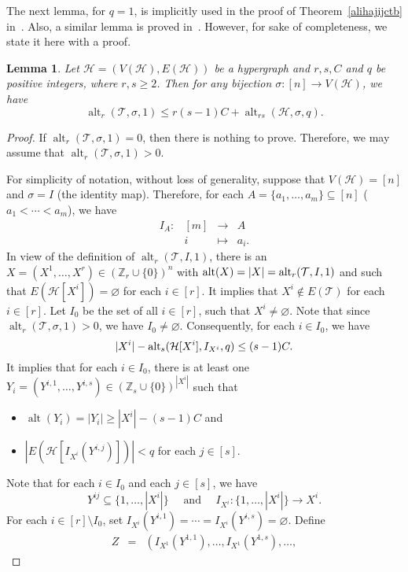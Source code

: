 \documentclass[11pt]{amsart}
\newtheorem{lemma}{Lemma}
\theoremstyle{definition}
\theoremstyle{remark}
\def\T{\mathsf{T}}
\def\alt{\operatorname{alt}}
\def\T{\mathcal{T}}
\begin{document}
The next lemma, for $q=1$, is implicitly used in the proof of Theorem~\ref{alihajijctb} in~\cite{2013arXiv1302.5394A}.  Also, a similar lemma is proved in~\cite{HaMe16}.
However, for sake of completeness, we state it here with a proof.
\begin{lemma}\label{altT}
Let $\mathcal{H}=(V(\mathcal{H}),E(\mathcal{H}))$ be a hypergraph and $r, s, C$ and $q$ be positive integers, where $r,s\geq 2$. 
Then for any bijection $\sigma: [n]\longrightarrow  V(\mathcal{H})$, we have
$$\alt_r(\T,\sigma,1)\leq r(s-1)C+\alt_{rs}(\mathcal{H},\sigma,q).$$
\end{lemma}
\begin{proof}
If $\alt_r(\T,\sigma,1)=0$, then there is nothing to prove. Therefore, we may assume that 
$\alt_r(\T,\sigma,1)>0$. 

For simplicity of notation, 
without loss of generality, suppose that $V(\mathcal{H})=[n]$ and $\sigma=I$ (the identity map).
Therefore, for each $A=\{a_1,\ldots,a_m\}\subseteq [n]$ ($a_1< \cdots< a_m$), we have
$$\begin{array}{lrll}
I_A:& [m] & \longrightarrow & A\\
	     & i    &\longmapsto    & a_i.
\end{array}
$$
In view of the definition of $\alt_r(\T,I,1)$, there is an $X=(X^1,\ldots,X^r)\in (\mathbb{Z}_r\cup\{0\})^n$ 
with ${\rm alt}(X)=|X|=\alt_r(\T,I,1)$ and 
such that $E(\mathcal{H}[X^i])=\varnothing$ for each $i\in[r]$. It implies that 
$X^i\not\in E(\T)$ for each $i\in[r]$. 
Let $I_0$ be the set of all $i\in[r]$, such that 
$X^i\neq\varnothing$. Note that since $\alt_r(\T,\sigma,1)>0$, we have $I_0\neq \varnothing$.
Consequently,  for each $i\in I_0$, 
we have 
$$|X^i|-{\rm alt}_s(\mathcal{H}[X^i],I_{X^i},q)\leq (s-1)C.$$
It implies that for each $i\in I_0$,  there is at least one  
$Y_i=(Y^{i,1},\ldots,Y^{i,s})\in(\mathbb{Z}_s\cup\{0\})^{|X^i|}$ such that 
\begin{itemize}
\item $\alt(Y_i)=|Y_i| \geq |X^i|-(s-1)C$ and
\item $|E(\mathcal{H}[I_{X^i}(Y^{i,j})])|<q$ for each $j\in[s]$.
\end{itemize}
Note that for each $i\in I_0$ and each $j\in[s]$, we have 
$$Y^{ij}\subseteq \{1,\ldots,|X^i|\}\quad\mbox{ and }\quad I_{X^i}:\{1,\ldots,|X^i|\}\longrightarrow X^i.$$ 
For each $i\in [r]\setminus I_0$, set $I_{X^i}(Y^{i,1})=\cdots=I_{X^i}(Y^{i,s})=\varnothing$. 
Define 
$$
\begin{array}{lll}
Z& =& \left(I_{X^1}(Y^{1,1}),\ldots,I_{X^1}(Y^{1,s}),\ldots,

\end{array}$$
\end{proof}
\end{document}
